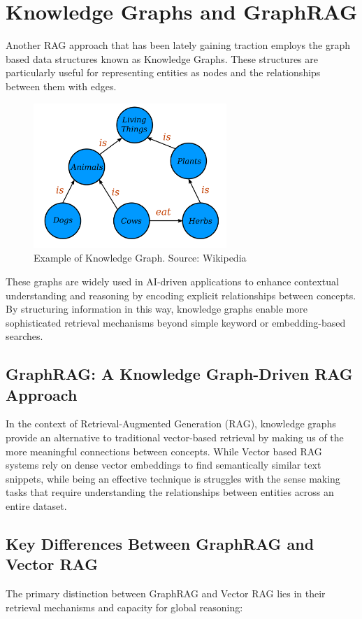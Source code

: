 \section{Knowledge Graphs and GraphRAG}
Another RAG approach that has been lately gaining traction employs the graph based data structures known as Knowledge Graphs. These structures are particularly useful for representing entities as nodes and the relationships between them with edges.
\begin{figure}[h]
    \centering
\includegraphics[width=0.65\textwidth]{IMAGES/Conceptual_Diagram_-_Example.svg.png}
    \caption[Knowledge Graph]{Example of Knowledge Graph. Source: Wikipedia\footnotemark}
    \label{fig:Knowledge Graph}
\end{figure}
These graphs are widely used in AI-driven applications to enhance contextual understanding and reasoning by encoding explicit relationships between concepts. By structuring information in this way, knowledge graphs enable more sophisticated retrieval mechanisms beyond simple keyword or embedding-based searches. 

\subsection{GraphRAG: A Knowledge Graph-Driven RAG Approach}
In the context of Retrieval-Augmented Generation (RAG), knowledge graphs provide an alternative to traditional vector-based retrieval by making us of the more meaningful connections between concepts. While Vector based RAG systems rely on dense vector embeddings to find semantically similar text snippets, while being an effective technique is struggles with the sense making tasks that require understanding the relationships between entities across an entire dataset.

\subsection{Key Differences Between GraphRAG and Vector RAG}
The primary distinction between GraphRAG and Vector RAG lies in their retrieval mechanisms and capacity for global reasoning:

